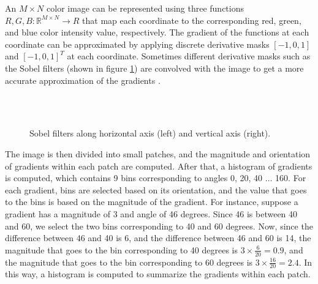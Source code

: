 \noindent An $M \times N$ color image can be represented using three functions $R,G,B : \mathbb{R}^{M \times N} \rightarrow R$ that map each coordinate to the corresponding red, green, and blue color intensity value, respectively. The gradient of the functions at each coordinate can be approximated by applying discrete derivative masks $[-1,0,1]$ and $[-1,0,1]^T$ at each coordinate. Sometimes different derivative masks such as the Sobel filters (shown in figure \ref{sobel}) are convolved with the image to get a more accurate approximation of the gradients \cite{Gupta2013SobelED}.
\begin{figure}[H]
\centering
{}
\qquad
{}\hspace{\fill}\\\hspace{\fill}\\[-2ex]
\caption[Sobel Filters]{Sobel filters along horizontal axis (left) and vertical axis (right).}
\label{sobel}
\end{figure}
\noindent The image is then divided into small patches, and the magnitude and orientation of gradients within each patch are computed. After that, a histogram of gradients is computed, which contains 9 bins corresponding to angles 0, 20, 40 $\ldots$ 160. For each gradient, bins are selected based on its orientation, and the value that goes to the bins is based on the magnitude of the gradient. For instance, suppose a gradient has a magnitude of 3 and angle of 46 degrees. Since 46 is between 40 and 60, we select the two bins corresponding to 40 and 60 degrees. Now, since the difference between 46 and 40 is 6, and the difference between 46 and 60 is 14, the magnitude that goes to the bin corresponding to 40 degrees is $3 \times \frac{6}{20} = 0.9$, and the magnitude that goes to the bin corresponding to 60 degrees is $3 \times \frac{16}{20} = 2.4$. In this way, a histogram is computed to summarize the gradients within each patch.\\

